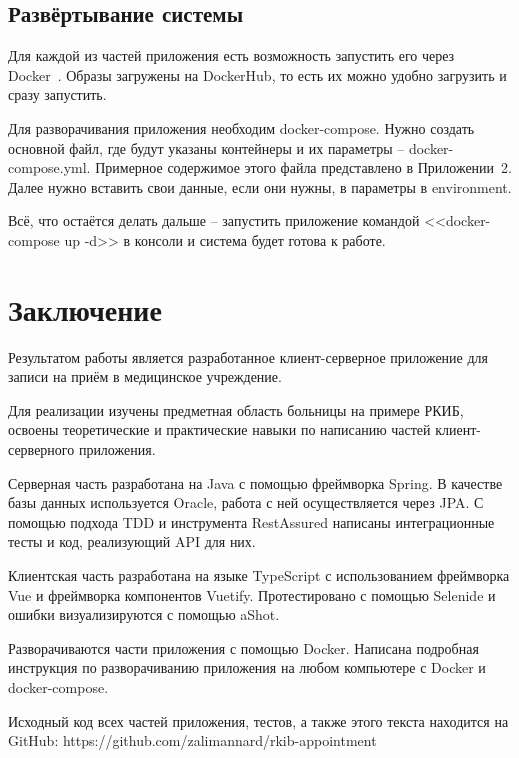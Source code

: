 \documentclass[a4paper,article]{article}
\begin{document}
\begin{sloppypar}
    \newpage

    \subsection{Развёртывание системы}\label{Реализация. Сборка и развертывание}
    
    Для каждой из частей приложения есть возможность запустить его через Docker~\cite{dockerdoc}. Образы загружены на DockerHub, то есть их можно удобно загрузить и сразу запустить.
    
    Для разворачивания приложения необходим docker-compose. Нужно создать основной файл, где будут указаны контейнеры и их параметры -- docker-compose.yml. Примерное содержимое этого файла представлено в Приложении~2. Далее нужно вставить свои данные, если они нужны, в параметры в environment.
    
    Всё, что остаётся делать дальше -- запустить приложение командой <<docker-compose up -d>> в консоли и система будет готова к работе.

    \newpage

    \section*{Заключение}
    
    Результатом работы является разработанное клиент-серверное приложение для записи на приём в медицинское учреждение.
    
    Для реализации изучены предметная область больницы на примере РКИБ, освоены теоретические и практические навыки по написанию частей клиент-серверного приложения. 
    
    Серверная часть разработана на Java с помощью фреймворка Spring. В качестве базы данных используется Oracle, работа с ней осуществляется через JPA. С помощью подхода TDD и инструмента RestAssured написаны интеграционные тесты и код, реализующий API для них.
    
    Клиентская часть разработана на языке TypeScript с использованием фреймворка Vue и фреймворка компонентов Vuetify. Протестировано с помощью Selenide и ошибки визуализируются с помощью aShot.
    
    Разворачиваются части приложения с помощью Docker. Написана подробная инструкция по разворачиванию приложения на любом компьютере с Docker и docker-compose.
    
    Исходный код всех частей приложения, тестов, а также этого текста находится на GitHub: https://github.com/zalimannard/rkib-appointment


\end{sloppypar}
\end{document}
